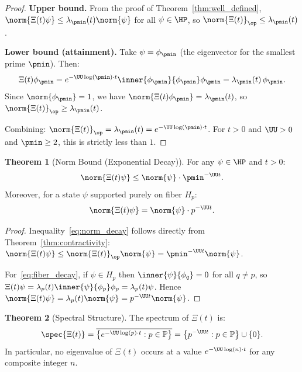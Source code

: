 \documentclass[12pt,letterpaper]{article}
\theoremstyle{definition}
\newtheorem{theorem}{Theorem}[section]
\theoremstyle{remark}
\begin{document}
\begin{proof}
\textbf{Upper bound.}
From the proof of Theorem~\ref{thm:well_defined},
$\norm{\Xi(t)\psi} \leq \lambda_{\pmin}(t)\norm{\psi}$ for all $\psi\in\HP$,
so $\norm{\Xi(t)}_\op \leq \lambda_{\pmin}(t)$.

\textbf{Lower bound (attainment).}
Take $\psi = \phi_{\pmin}$ (the eigenvector for the smallest prime $\pmin$).
Then:
\[
  \Xi(t)\phi_{\pmin}
  = e^{-\UU\log(\pmin)\cdot t}\inner{\phi_{\pmin}}{\phi_{\pmin}}\phi_{\pmin}
  = \lambda_{\pmin}(t)\,\phi_{\pmin}.
\]
Since $\norm{\phi_{\pmin}} = 1$, we have
$\norm{\Xi(t)\phi_{\pmin}} = \lambda_{\pmin}(t)$,
so $\norm{\Xi(t)}_\op \geq \lambda_{\pmin}(t)$.

Combining: $\norm{\Xi(t)}_\op = \lambda_{\pmin}(t) = e^{-\UU\log(\pmin)\cdot t}$.
For $t > 0$ and $\UU > 0$ and $\pmin \geq 2$, this is strictly less than $1$.
\end{proof}

\begin{theorem}[Norm Bound (Exponential Decay)]
\label{thm:norm_bound}
For any $\psi \in \HP$ and $t > 0$:
\begin{equation}
  \norm{\Xi(t)\psi} \leq \norm{\psi}\cdot \pmin^{-\UU t}.
  \label{eq:norm_decay}
\end{equation}
Moreover, for a state $\psi$ supported purely on fiber $H_p$:
\begin{equation}
  \norm{\Xi(t)\psi} = \norm{\psi}\cdot p^{-\UU t}.
  \label{eq:fiber_decay}
\end{equation}
\end{theorem}

\begin{proof}
Inequality~\eqref{eq:norm_decay} follows directly from
Theorem~\ref{thm:contractivity}:
$\norm{\Xi(t)\psi} \leq \norm{\Xi(t)}_\op\norm{\psi} = \pmin^{-\UU t}\norm{\psi}$.

For~\eqref{eq:fiber_decay}, if $\psi \in H_p$ then
$\inner{\psi}{\phi_{q}} = 0$ for all $q \neq p$,
so $\Xi(t)\psi = \lambda_p(t)\inner{\psi}{\phi_p}\phi_p = \lambda_p(t)\psi$.
Hence $\norm{\Xi(t)\psi} = \lambda_p(t)\norm{\psi} = p^{-\UU t}\norm{\psi}$.
\end{proof}

\begin{theorem}[Spectral Structure]
\label{thm:spectrum}
The spectrum of $\Xi(t)$ is:
\begin{equation}
  \spec{\Xi(t)} = \overline{\left\{e^{-\UU\log(p)\cdot t} : p \in \mathbb{P}\right\}}
  = \left\{p^{-\UU t} : p \in \mathbb{P}\right\} \cup \{0\}.
\end{equation}
In particular, no eigenvalue of $\Xi(t)$ occurs at a value $e^{-\UU\log(n)\cdot t}$
for any composite integer $n$.
\end{theorem}
\end{document}
